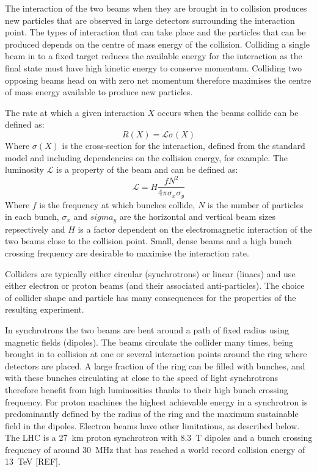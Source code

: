 The interaction of the two beams when they are brought in to collision produces new particles that are observed in large detectors surrounding the interaction point. The types of interaction that can take place and the particles that can be produced depends on the centre of mass energy of the collision. Colliding a single beam in to a fixed target reduces the available energy for the interaction as the final state must have high kinetic energy to conserve momentum. Colliding two opposing beams head on with zero net momentum therefore maximises the centre of mass energy available to produce new particles.

The rate at which a given interaction \(X\) occurs when the beams collide can be defined as:
\begin{equation}
R(X) = \mathscr{L} \sigma(X)
\end{equation}
Where \(\sigma(X)\) is the cross-section for the interaction, defined from the standard model and including dependencies on the collision energy, for example. The luminosity \(\mathscr{L}\) is a property of the beam and can be defined as:
\begin{equation}
\mathscr{L} = H\frac{fN^2}{4\pi\sigma_x\sigma_y}
\end{equation}
Where \(f\) is the frequency at which bunches collide, \(N\) is the number of particles in each bunch, \(\sigma_x\) and \(sigma_y\) are the horizontal and vertical beam sizes repsectively and \(H\) is a factor dependent on the electromagnetic interaction of the two beams close to the collision point. Small, dense beams and a high bunch crossing frequency are desirable to maximise the interaction rate.


Colliders are typically either circular (synchrotrons) or linear (linacs) and use either electron or proton beams (and their associated anti-particles). The choice of collider shape and particle has many consequences for the properties of the resulting experiment. 

In synchrotrons the two beams are bent around a path of fixed radius using magnetic fields (dipoles). The beams circulate the collider many times, being brought in to collision at one or several interaction points around the ring where detectors are placed. A large fraction of the ring can be filled with bunches, and with these bunches circulating at close to the speed of light synchrotrons therefore benefit from high luminosities thanks to their high bunch crossing frequency. For proton machines the highest achievable energy in a synchrotron is predominantly defined by the radius of the ring and the maximum sustainable field in the dipoles. Electron beams have other limitations, as described below. The LHC is a 27~km proton synchrotron with 8.3~T dipoles and a bunch crossing frequency of around 30~MHz that has reached a world record collision energy of 13~TeV [REF].

